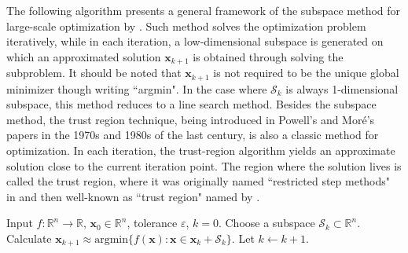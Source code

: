 \documentclass[colorlinks=true, linkcolor=blue, citecolor=blue, urlcolor=blue]{article}
\theoremstyle{plain}
\theoremstyle{definition}
\theoremstyle{remark}
\newcommand{\RR}{\mathbb{R}}
\newcommand{\eps}{\varepsilon}
\begin{document}
The following algorithm presents a general framework of the subspace method for large-scale optimization by \citet{Conn_Toint_Sartenaer_Gould_1996}. Such method solves the optimization problem iteratively, while in each iteration, a low-dimensional subspace is generated on which an approximated solution $\bm x_{k+1}$ is obtained through solving the subproblem. It should be noted that $\bm x_{k+1}$ is not required to be the unique global minimizer though writing ``argmin". In the case where $\mathcal{S}_k$ is always 1-dimensional subspace, this method reduces to a line search method. Besides the subspace method, the trust region technique, being introduced in Powell's \cite{RN53} and Mor\'{e}'s \cite{More1980} papers in the 1970s and 1980s of the last century, is also a classic method for optimization. In each iteration, the trust-region algorithm yields an approximate solution close to the current iteration point. The region where the solution lives is called the trust region, where it was originally named ``restricted step methods" in \citet{FletcherBook2000} and then well-known as ``trust region" named by \citet{Sorensen1982}.


\begin{algorithm}
\caption{Subspace-based optimization method framework}
\vskip6pt
\begin{algorithmic}[1]
    \State Input $f: \RR^n \to \RR$, $\bm x_0\in\RR^n$, tolerance $\eps$, $k=0$.
    \For{$\Vert \bm g_k\Vert\geq \eps$}
        \State Choose a subspace $\mathcal{S}_k \subset\RR^n$.
            \State Calculate $\bm x_{k+1} \approx \mathrm{argmin} \{f(\bm x) \mathrel{:} \bm x\in \bm x_k+\mathcal{S}_k\}$.
        \State Let $k\leftarrow k+1$.
    \EndFor
\end{algorithmic}
\end{algorithm}
\end{document}
